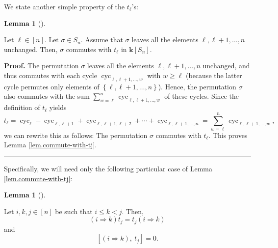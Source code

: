 \documentclass[numbers=enddot,12pt,final,onecolumn,notitlepage]{scrartcl}%
\theoremstyle{definition}
\newtheorem{lem}[theo]{Lemma}
\newenvironment{lemma}[1][]
{\begin{lem}[#1]\begin{leftbar}}
{\end{leftbar}\end{lem}}
\newenvironment{proof}[1][Proof]{\noindent\textbf{#1.} }{\ \rule{0.5em}{0.5em}}
\let\sumnonlimits\sum
\renewcommand{\sum}{\sumnonlimits\limits}
\begin{document}
We state another simple property of the $t_{\ell}$'s:

\begin{lemma}
\label{lem.commute-with-tj}Let $\ell\in\left[  n\right]  $. Let $\sigma\in
S_{n}$. Assume that $\sigma$ leaves all the elements $\ell,\ell+1,\ldots,n$
unchanged. Then, $\sigma$ commutes with $t_{\ell}$ in $\mathbf{k}\left[
S_{n}\right]  $.
\end{lemma}

\begin{proof}
The permutation $\sigma$ leaves all the elements $\ell,\ell+1,\ldots,n$
unchanged, and thus commutes with each cycle $\operatorname*{cyc}%
\nolimits_{\ell,\ell+1,\ldots,w}$ with $w\geq\ell$ (because the latter cycle
permutes only elements of $\left\{  \ell,\ell+1,\ldots,n\right\}  $). Hence,
the permutation $\sigma$ also commutes with the sum $\sum_{w=\ell}%
^{n}\operatorname*{cyc}\nolimits_{\ell,\ell+1,\ldots,w}$ of these cycles.
Since the definition of $t_{\ell}$ yields%
\[
t_{\ell}=\operatorname*{cyc}\nolimits_{\ell}+\operatorname*{cyc}%
\nolimits_{\ell,\ell+1}+\operatorname*{cyc}\nolimits_{\ell,\ell+1,\ell
+2}+\cdots+\operatorname*{cyc}\nolimits_{\ell,\ell+1,\ldots,n}=\sum_{w=\ell
}^{n}\operatorname*{cyc}\nolimits_{\ell,\ell+1,\ldots,w},
\]
we can rewrite this as follows: The permutation $\sigma$ commutes with
$t_{\ell}$. This proves Lemma \ref{lem.commute-with-tj}.
\end{proof}

Specifically, we will need only the following particular case of Lemma
\ref{lem.commute-with-tj}:

\begin{lemma}
\label{lem.commute-with-tj-specific}Let $i,k,j\in\left[  n\right]  $ be such
that $i\leq k<j$. Then,%
\begin{equation}
\left(  i\Longrightarrow k\right)  t_{j}=t_{j}\left(  i\Longrightarrow
k\right)  \label{eq.lem.commute-with-tj-specific.ab=ba}%
\end{equation}
and%
\begin{equation}
\left[  \left(  i\Longrightarrow k\right)  ,\ t_{j}\right]  =0.
\label{eq.lem.commute-with-tj-specific.comm}%
\end{equation}

\end{lemma}
\end{document}
